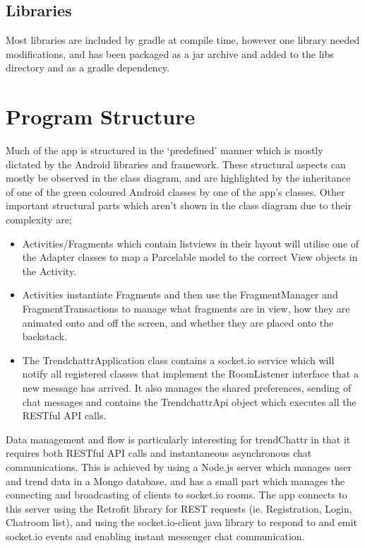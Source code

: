 \documentclass[11pt,english,numbers=endperiod,parskip=half]{scrartcl}
\begin{document}
  \subsection{Libraries}
  Most libraries are included by gradle at compile time, however one library
  needed modifications, and has been packaged as a jar archive and added
  to the libs directory and as a gradle dependency.
\section{Program Structure}
  Much of the app is structured in the `predefined' manner which is mostly
  dictated by the Android libraries and framework. These structural aspects can
  mostly be observed in the class diagram, and are highlighted by the
  inheritance of one of the green coloured Android classes by one of the app's
  classes. Other important structural parts which aren't shown in the class
  diagram due to their complexity are;
  \begin{itemize}
      \item{
        Activities/Fragments which contain listviews in their layout will
        utilise one of the Adapter classes to map a Parcelable model to
        the correct View objects in the Activity.
      }
      \item{
        Activities instantiate Fragments and then use the FragmentManager
        and FragmentTransactions to manage what fragments are in view,
        how they are animated onto and off the screen, and whether they are
        placed onto the backstack.
      }
      \item{
        The TrendchattrApplication class contains a socket.io service which
        will notify all registered classes that implement the RoomListener
        interface that a new message has arrived. It also manages the shared
        preferences, sending of chat messages and contains the TrendchattrApi
        object which executes all the RESTful API calls.
      }
  \end{itemize}

  Data management and flow is particularly interesting for trendChattr in that
  it requires both RESTful API calls and instantaneous asynchronous chat
  communications. This is achieved by using a Node.js server which manages
  user and trend data in a Mongo database, and has a small part which manages
  the connecting and broadcasting of clients to socket.io rooms. The app connects
  to this server using the Retrofit library for REST requests (ie. Registration,
  Login, Chatroom list), and using the socket.io-client java library to respond
  to and emit socket.io events and enabling instant messenger chat communication.
\end{document}
